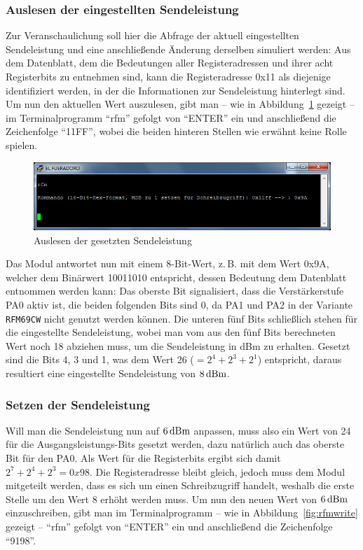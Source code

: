 \documentclass[pdftex, parskip, numbers=noenddot, toc=listof]{scrbook}
\begin{document}
				\subsubsection{Auslesen der eingestellten Sendeleistung}
					\label{subsec:readpower}

					Zur Veranschaulichung soll hier die Abfrage der aktuell eingestellten Sendeleistung und eine anschließende Änderung derselben simuliert werden: Aus dem Datenblatt, dem die Bedeutungen aller Registeradressen und ihrer acht Registerbits zu entnehmen sind, kann die Registeradresse 0x11 als diejenige identifiziert werden, in der die Informationen zur Sendeleistung hinterlegt sind. Um nun den aktuellen Wert auszulesen, gibt man -- wie in Abbildung~\ref{fig:rfmread} gezeigt -- im Terminalprogramm \enquote{rfm} gefolgt von \enquote{ENTER} ein und anschließend die Zeichenfolge \enquote{11FF}, wobei die beiden hinteren Stellen wie erwähnt keine Rolle spielen.

					\begin{figure}
						\centering
						\includegraphics[width=.8\textwidth]{Bilder/rfmbefehl}
						\caption{Auslesen der gesetzten Sendeleistung}
						\label{fig:rfmread}
					\end{figure}

					Das Modul antwortet nun mit einem 8-Bit-Wert, z.\,B. mit dem Wert 0x9A, welcher dem Binärwert 10011010 entspricht, dessen Bedeutung dem Datenblatt entnommen werden kann: Das oberste Bit signalisiert, dass die Verstärkerstufe PA0 aktiv ist, die beiden folgenden Bits sind 0, da PA1 und PA2 in der Variante \texttt{RFM69CW} nicht genutzt werden können. Die unteren fünf Bits schließlich stehen für die eingestellte Sendeleistung, wobei man vom aus den fünf Bits berechneten Wert noch 18 abziehen muss, um die Sendeleistung in dBm zu erhalten. Gesetzt sind die Bits 4, 3 und 1, was dem Wert 26 ($= 2^4 + 2^3 + 2^1$) entspricht, daraus resultiert eine eingestellte Sendeleistung von $\unit[8]{dBm}$.

				\subsubsection{Setzen der Sendeleistung}

					Will man die Sendeleistung nun auf $\unit[6]{dBm}$ anpassen, muss also ein Wert von 24 für die Aus\-gangs\-lei\-stungs-Bits gesetzt werden, dazu natürlich auch das oberste Bit für den PA0. Als Wert für die Registerbits ergibt sich damit $2^7 + 2^4 + 2^3 = 0x98$. Die Registeradresse bleibt gleich, jedoch muss dem Modul mitgeteilt werden, dass es sich um einen Schreibzugriff handelt, weshalb die erste Stelle um den Wert 8 erhöht werden muss. Um nun den neuen Wert von $\unit[6]{dBm}$ einzuschreiben, gibt man im Terminalprogramm -- wie in Abbildung~\ref{fig:rfmwrite} gezeigt -- \enquote{rfm} gefolgt von \enquote{ENTER} ein und anschließend die Zeichenfolge \enquote{9198}.
\end{document}
